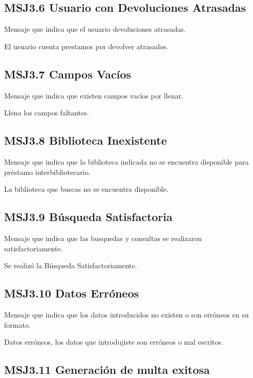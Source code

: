 \subsection{MSJ3.6 Usuario con Devoluciones Atrasadas }

Mensaje que indica que el usuario devoluciones atrasadas.

  \noindent El usuario cuenta prestamos por devolver atrasados.
  
\subsection{MSJ3.7 Campos Vacíos }

Mensaje que indica que existen campos vacíos por llenar.

  \noindent Llena los campos faltantes.
  
\subsection{MSJ3.8 Biblioteca Inexistente }

Mensaje que indica que la biblioteca indicada no se encuentra disponible para préstamo interbibliotecario.

  \noindent La biblioteca que buscas no se encuentra disponible.
  
\subsection{MSJ3.9 Búsqueda Satisfactoria }

Mensaje que indica que las busquedas y consultas se realizaron satisfactoriamente.

  \noindent Se realizó la Búsqueda Satisfactoriamente.
 
\subsection{MSJ3.10 Datos Erróneos }

Mensaje que indica que los datos introducidos no existen o son erróneos en su formato.

  \noindent Datos erróneos, los datos que introdujiste son erróneos o mal escritos.
  
\subsection{MSJ3.11 Generación de multa exitosa }

